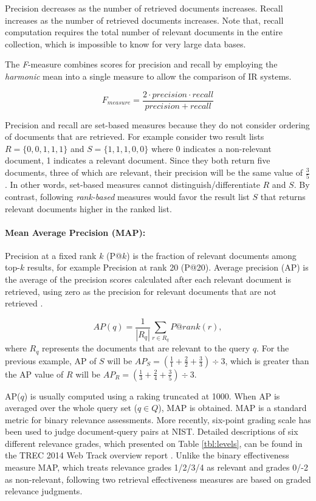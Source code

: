 Precision decreases as the number of retrieved documents increases.
Recall increases as the number of retrieved documents increases.
Note that, recall computation requires the total number of relevant documents in the entire collection, which is impossible to know for very large data bases.


The \emph{F}-measure combines scores for precision and recall by employing the \emph{harmonic} mean into a single measure to allow the comparison of IR systems.

\begin{equation}\label{fm}
F_{measure} = \frac{2 \cdot precision \cdot recall}{precision + recall}
\end{equation}


Precision and recall are set-based measures because they do not consider ordering of documents that are retrieved.
For example consider two result lists $R = \{0,0,1,1,1\}$ and $S = \{1,1,1,0,0\}$ where 0 indicates a non-relevant document, 1 indicates a relevant document.
Since they both return five documents, three of which are relevant, their precision will be the same value of $\frac{3}{5}$.
In other words, set-based measures cannot distinguish/differentiate $R$ and $S$.
By contrast, following \emph{rank-based} measures would favor the result list $S$ that returns relevant documents higher in the ranked list.


\paragraph{Mean Average Precision (MAP):} Precision at a fixed rank $k$ (P@$k$) is the fraction of relevant documents among top-$k$ results, for example Precision at rank 20 (P@20).
Average precision (AP) is the average of the precision scores calculated after each relevant document is retrieved, using zero as the precision for relevant documents that are not retrieved \citep{MAP}.

\begin{equation} \label{eq:map}
AP(q) =  \frac{1}{|R_q|} \sum\limits_{r \in R_q} P@rank(r),
\end{equation}
where $R_q$ represents the documents that are relevant to the query $q$.
For the previous example, AP of $S$ will be $AP_S = \left( \frac{1}{1}+\frac{2}{2}+\frac{3}{3} \right) \div 3$, which is greater than the AP value of $R$ will be $AP_R = \left( \frac{1}{3}+\frac{2}{4}+\frac{3}{5} \right) \div 3$.

AP($q$) is usually computed using a raking truncated at 1000.
When AP is averaged over the whole query set ($q \in Q$), MAP is obtained.
MAP is a standard metric for binary relevance assessments.
More recently, six-point grading scale has been used to judge document-query pairs at NIST.
Detailed descriptions of six different relevance grades, which presented on Table \ref{tbl:levels}, can be found in the TREC 2014 Web Track overview report \citep{2014web}.
Unlike the binary effectiveness measure MAP, which treats relevance grades 1/2/3/4 as relevant and grades 0/-2 as non-relevant, following two retrieval effectiveness measures are based on graded relevance judgments.

